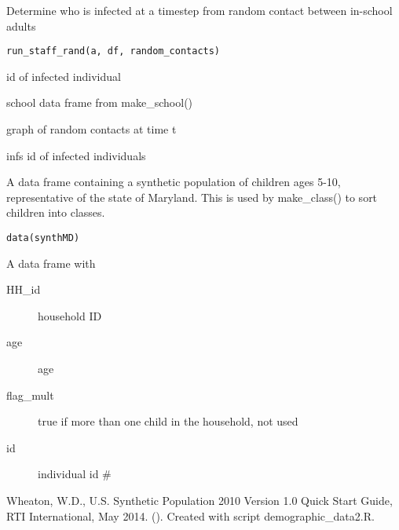 \documentclass[a4paper]{book}
\begin{document}
%
\begin{Description}\relax
Determine who is infected at a timestep
from random contact between in-school adults
\end{Description}
%
\begin{Usage}
\begin{verbatim}
run_staff_rand(a, df, random_contacts)
\end{verbatim}
\end{Usage}
%
\begin{Arguments}
\begin{ldescription}
\item[\code{a}] id of infected individual

\item[\code{df}] school data frame from make\_school()

\item[\code{random\_contacts}] graph of random contacts at time t
\end{ldescription}
\end{Arguments}
%
\begin{Value}
infs id of infected individuals
\end{Value}
%
\begin{Description}\relax
A data frame containing a synthetic population of children
ages 5-10, representative of the state of Maryland.
This is used by make\_class() to sort children into classes.
\end{Description}
%
\begin{Usage}
\begin{verbatim}
data(synthMD)
\end{verbatim}
\end{Usage}
%
\begin{Format}
A data frame with
\begin{description}

\item[HH\_id] household ID
\item[age] age
\item[flag\_mult] true if more than one child in the household, not used
\item[id] individual id \#

\end{description}

\end{Format}
%
\begin{Source}\relax
Wheaton, W.D., U.S. Synthetic Population 2010 Version 1.0 Quick Start Guide, RTI International, May 2014.
().  Created with script demographic\_data2.R.
\end{Source}
\printindex{}
\end{document}
